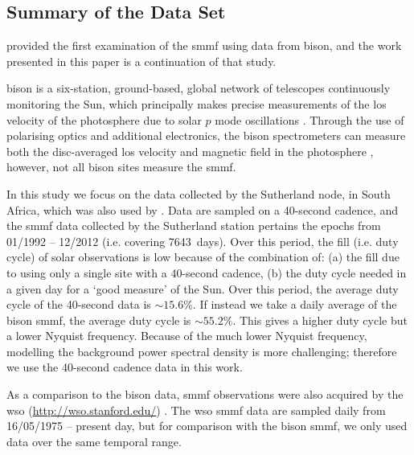 \subsection{Summary of the Data Set}

\citet{chaplin_studies_2003} provided the first examination of the \gls{smmf} using data from \gls{bison}, and the work presented in this paper is a continuation of that study.

\gls{bison} is a six-station, ground-based, global network of telescopes continuously monitoring the Sun, which principally makes precise measurements of the \gls{los} velocity of the photosphere due to solar $p$ mode oscillations \citep{hale_performance_2016}. Through the use of polarising optics and additional electronics, the \gls{bison} spectrometers can measure both the disc-averaged \gls{los} velocity and magnetic field in the photosphere \citep{chaplin_studies_2003}, however, not all \gls{bison} sites measure the \gls{smmf}. %

In this study we focus on the data collected by the Sutherland node, in South Africa, which was also used by \cite{chaplin_studies_2003}. Data are sampled on a 40-second cadence, and the \gls{smmf} data collected by the Sutherland station pertains the epochs from 01/1992 -- 12/2012 (i.e. covering 7643~days). Over this period, the fill (i.e. duty cycle) of solar observations is low because of the combination of: (a) the fill due to using only a single site with a 40-second cadence, (b) the duty cycle needed in a given day for a `good measure' of the Sun. Over this period, the average duty cycle of the 40-second data is $\sim 15.6\%$. If instead we take a daily average of the \gls{bison} \gls{smmf}, the average duty cycle is $\sim 55.2\%$. This gives a higher duty cycle but a lower Nyquist frequency. Because of the much lower Nyquist frequency, modelling the background power spectral density is more challenging; therefore we use the 40-second cadence data in this work.

As a comparison to the \gls{bison} data, \gls{smmf} observations were also acquired by the \gls{wso} (\url{http://wso.stanford.edu/}) \citep{scherrer_mean_1977-1}. The \gls{wso} \gls{smmf} data are sampled daily from 16/05/1975 -- present day, but for comparison with the \gls{bison} \gls{smmf}, we only used data over the same temporal range.

